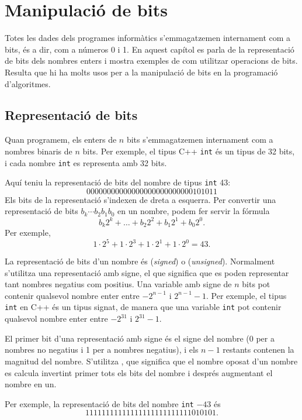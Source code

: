\chapter{Manipulació de bits}

Totes les dades dels programes informàtics s'emmagatzemen internament
com a bits, és a dir, com a números 0 i 1. En aquest capítol es parla
de la representació de bits dels nombres enters i mostra exemples de
com utilitzar operacions de bits. Resulta que hi ha molts usos per a
la manipulació de bits en la programació d'algoritmes.

\section{Representació de bits}


Quan programem, els enters de $n$ bits s'emmagatzemen internament com
a nombres binaris de $n$ bits. Per exemple, el tipus C++ \texttt{int}
és un tipus de 32 bits, i cada nombre \texttt{int} es representa amb
32 bits.

Aquí teniu la representació de bits del nombre de tipus \texttt{int} 43:
\[00000000000000000000000000101011\]
Els bits de la representació s'indexen de dreta a esquerra. Per
convertir una representació de bits $b_k \cdots b_2 b_1 b_0$ en un
nombre, podem fer servir la fórmula
\[b_k 2^k + \ldots + b_2 2^2 + b_1 2^1 + b_0 2^0.\]
Per exemple,
\[1 \cdot 2^5 + 1 \cdot 2^3 + 1 \cdot 2^1 + 1 \cdot 2^0 = 43.\]


La representació de bits d'un nombre és 
(\emph{signed}) o  (\emph{unsigned}). Normalment
s'utilitza una representació amb signe, el que significa que es poden
representar tant nombres negatius com positius. Una variable amb signe
de $n$ bits pot contenir qualsevol nombre enter entre $-2^{n-1}$ i
$2^{n-1}-1$. Per exemple, el tipus \texttt{int} en C++ és un tipus
signat, de manera que una variable \texttt{int} pot contenir qualsevol
nombre enter entre $-2^{31}$ i $2^{31}-1$.

El primer bit d'una representació amb signe és el signe del nombre (0
per a nombres no negatius i 1 per a nombres negatius), i els $n-1$
restants contenen la magnitud del nombre. S'utilitza , que significa que el nombre oposat d'un nombre es calcula
invertint primer tots els bits del nombre i després augmentant el
nombre en un.

Per exemple, la representació de bits del nombre \texttt{int} $-43$ és
\[11111111111111111111111111010101.\]


